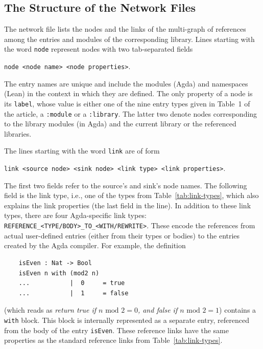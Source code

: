 \documentclass{article}
\begin{document}
\subsection{The Structure of the Network Files}
The network file lists the nodes and the links of the multi-graph of references among the entries and modules of the corresponding library. Lines starting with the word \texttt{node} represent nodes with two tab-separated fields
\begin{center}
    \texttt{node	<node name>	<node properties>}.
\end{center}
The entry names are unique and include the modules (Agda) and namespaces (Lean) in the context in which they are defined. The only property of a node is its \texttt{label}, whose value is either one of the nine entry types given in Table~1 of the article, a \texttt{:module} or a \texttt{:library}. The latter two denote nodes corresponding to the library modules (in Agda) and the current library or the referenced libraries.

The lines starting with the word \texttt{link} are of form
\begin{center}
    \texttt{link	<source node>	<sink node>	<link type>	<link properties>}.
\end{center}
The first two fields refer to the source’s and sink’s node names. The following field is the link type, i.e., one of the types from Table~\ref{tab:link-types}, which also explains the link properties (the last field in the line). In addition to these link types, there are four Agda-specific link types: \texttt{REFERENCE\_<TYPE/BODY>\_TO\_<WITH/REWRITE>}. These encode the references from actual user-defined entries
(either from their types or bodies) to the entries created by the Agda compiler. For example, the definition
\begin{verbatim}
    isEven : Nat -> Bool
    isEven n with (mod2 n)
    ...           |  0     = true
    ...           |  1     = false
\end{verbatim}
(which reads as \textit{return true if $n\text{ mod } 2 = 0$, and false if $n\text{ mod } 2 = 1$}) contains a \texttt{with} block. This block is internally represented as a separate entry, referenced from the body of the entry \texttt{isEven}. These reference links have the same properties as the standard reference links from Table~\ref{tab:link-types}.
\end{document}
